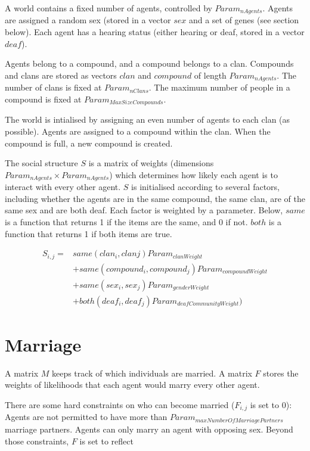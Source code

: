 \documentclass[11pt, oneside]{article}
\begin{document}
A world contains a fixed number of agents, controlled by $Param_{nAgents}$.  Agents are assigned a random sex (stored in a vector $sex$ and a set of genes (see section below).  Each agent has a hearing status (either hearing or deaf, stored in a vector $deaf$).  

Agents belong to a compound, and a compound belongs to a clan.  Compounds and clans are stored as vectors $clan$ and $compound$ of length $Param_{nAgents}$.  The number of clans is fixed at $Param_{nClans}$.  The maximum number of people in a compound is fixed at $Param_{MaxSizeCompounds}$.

The world is intialised by assigning an even number of agents to each clan (as possible).  Agents are assigned to a compound within the clan.  When the compound is full, a new compound is created.

The social structure $S$ is a matrix of weights (dimensions $Param_{nAgents} \times Param_{nAgents}$) which determines how likely each agent is to interact with every other agent.  $S$ is initialised according to several factors, including whether the agents are in the same compound, the same clan, are of the same sex and are both deaf.  Each factor is weighted by a parameter.  Below, $same$ is a function that returns 1 if the items are the same, and 0 if not.  $both$ is a function that returns 1 if both items are true.

\begin{equation}
\begin{aligned}
S_{i,j} = & same(clan_{i}, clan{j})Param_{clanWeight}   \\
	& + same(compound_i,compound_j)Param_{compoundWeight}  \\
	& + same(sex_i,sex_j)Param_{genderWeight}  \\
	& + both(deaf_i,deaf_j)Param_{deafCommunityWeight})
\end{aligned}
\end{equation}


\section{Marriage}
A matrix $M$ keeps track of which individuals are married.  A matrix $F$ stores the weights of likelihoods that each agent would marry every other agent.  

There are some hard constraints on who can become married ($F_{i,j}$ is set to 0):  Agents are not permitted to have more than $Param_{maxNumberOfMarriagePartners}$ marriage partners.  Agents can only marry an agent with opposing sex.  Beyond those constraints, $F$ is set to reflect
\end{document}
